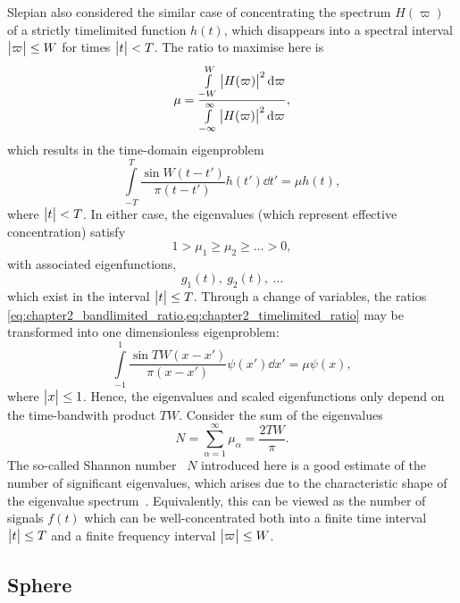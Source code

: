 Slepian also considered the similar case of concentrating the spectrum \(H(\varpi)\) of a strictly timelimited function \(h(t)\), which disappears into a spectral interval \(\big\lvert\varpi\big\rvert \leq W\) for times \(\big\lvert t\big\rvert < T\).
The ratio to maximise here is
%
\begin{equation}\label{eq:chapter2_timelimited_ratio}
	\mu
	= \frac{\int\limits_{-W}^{W} \big\lvert H(\varpi)\big\rvert^{2} \dd{\varpi}}{\int\limits_{-\infty}^{\infty} \big\lvert H(\varpi)\big\rvert^{2} \dd{\varpi}},
\end{equation}
%
which results in the time-domain eigenproblem
%
\begin{equation}
	\int\limits_{-T}^{T} \frac{\sin W(t-t')}{\pi(t-t')} h(t') \dd{t'}
	= \mu h(t),
\end{equation}
%
where \(\big\lvert t\big\rvert < T\).
In either case, the eigenvalues (which represent effective concentration) satisfy
%
\begin{equation}
	1 > \mu_{1} \geq \mu_{2} \geq \ldots > 0, %
\end{equation}
%
with associated eigenfunctions, \eg{}
%
\begin{equation}
	g_{1}(t),\ g_{2}(t),\ \ldots
\end{equation}
%
which exist in the interval \(\big\lvert t\big\rvert \leq T\).
Through a change of variables, the ratios \cref{eq:chapter2_bandlimited_ratio,eq:chapter2_timelimited_ratio} may be transformed into one dimensionless eigenproblem:
%
\begin{equation}
	\int\limits_{-1}^{1} \frac{\sin TW(x-x')}{\pi(x-x')} \psi(x') \dd{x'}
	= \mu \psi(x),
\end{equation}
%
where \(\big\lvert x\big\rvert \leq 1\).
Hence, the eigenvalues and scaled eigenfunctions only depend on the time-bandwith product \(TW\).
Consider the sum of the eigenvalues
%
\begin{equation}
	N
	= \sum\limits_{\alpha=1}^{\infty} \mu_{\alpha}
	= \frac{2TW}{\pi}.
\end{equation}
%
The so-called Shannon number~\cite{Percival1993} \(N\) introduced here is a good estimate of the number of significant eigenvalues, which arises due to the characteristic shape of the eigenvalue spectrum~\cite{Landau1965,Slepian1965}.
Equivalently, this can be viewed as the number of signals \(f(t)\) which can be well-concentrated both into a finite time interval \(\big\lvert t\big\rvert \leq T\) and a finite frequency interval \(\big\lvert\varpi\big\rvert \leq W\).

\subsection{Sphere}

